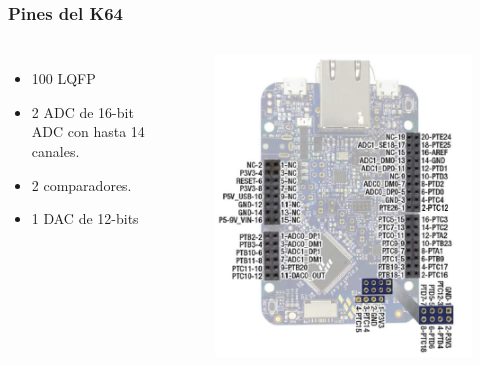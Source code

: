 \documentclass[10.5pt,scale=1.0,t,aspectratio=169,hyperref={pdfpagelabels=false}]{beamer}
\begin{document}
\begin{frame}
	\frametitle{Pines del K64}
	{\small
		\begin{columns}
			\begin{itemize}
				\item 100 LQFP
				\item 2 ADC de 16-bit ADC con hasta 14 canales. 
				\item 2 comparadores.
				\item 1 DAC de 12-bits
			\end{itemize}
			
			\begin{figure}
				\centering\includegraphics[scale=0.4]{fig_FRDMPinout}
			\end{figure}
			
		\end{columns}
	}	
\end{frame}
\end{document}
